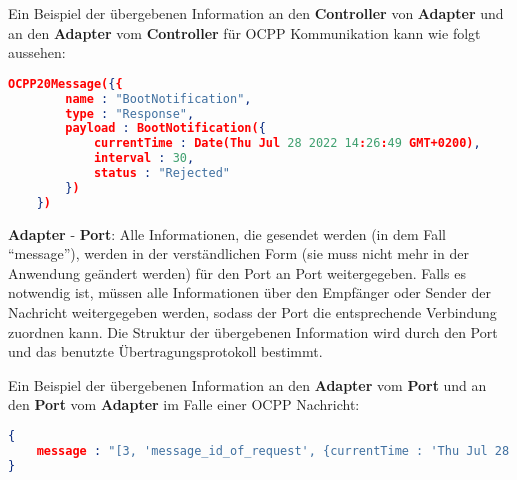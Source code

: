 \noindent Ein Beispiel der übergebenen Information an den \textbf{Controller} von \textbf{Adapter} 
und an den \textbf{Adapter} vom \textbf{Controller} für OCPP Kommunikation kann wie folgt aussehen:
\begin{lstlisting}[language=json,firstnumber=1]
    OCPP20Message({{
        name : "BootNotification",
        type : "Response",
        payload : BootNotification({
            currentTime : Date(Thu Jul 28 2022 14:26:49 GMT+0200),
            interval : 30,
            status : "Rejected"    
        })
    })
\end{lstlisting}

\noindent \textbf{Adapter} - \textbf{Port}: Alle Informationen, 
die gesendet werden (in dem Fall ``message''), werden in der verständlichen Form (sie muss nicht mehr in der Anwendung geändert werden)
für den Port an Port weitergegeben.
Falls es notwendig ist, müssen alle Informationen über den Empfänger oder Sender der Nachricht weitergegeben werden, 
sodass der Port die entsprechende Verbindung zuordnen kann. 
Die Struktur der übergebenen Information wird durch den Port und das benutzte Übertragungsprotokoll bestimmt. 

\noindent Ein Beispiel der übergebenen Information an den \textbf{Adapter} vom \textbf{Port} 
und an den \textbf{Port} vom \textbf{Adapter} im Falle einer OCPP Nachricht:
\begin{lstlisting}[language=json,firstnumber=1]
{
    message : "[3, 'message_id_of_request', {currentTime : 'Thu Jul 28 2022 14:26:49Z', interval : 30, status : 'Rejected'}]"
}
\end{lstlisting}